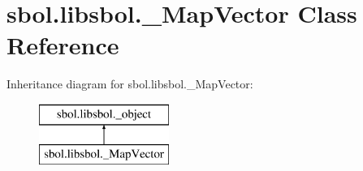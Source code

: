 \hypertarget{classsbol_1_1libsbol_1_1___map_vector}{}\section{sbol.\+libsbol.\+\_\+\+Map\+Vector Class Reference}
\label{classsbol_1_1libsbol_1_1___map_vector}
Inheritance diagram for sbol.\+libsbol.\+\_\+\+Map\+Vector\+:\begin{figure}[H]
\begin{center}
\leavevmode
\includegraphics[height=2.000000cm]{classsbol_1_1libsbol_1_1___map_vector}
\end{center}
\end{figure}

